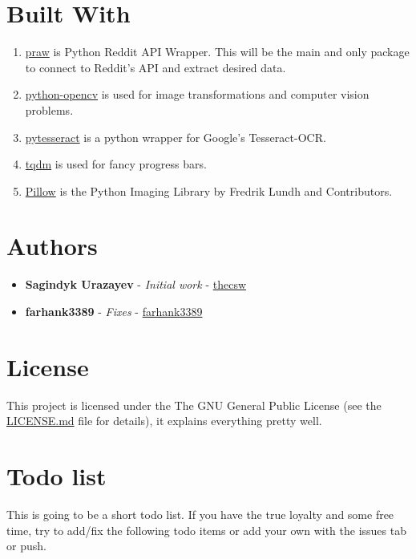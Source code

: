 \documentclass[11pt]{article}
\begin{document}
\section{Built With}
\label{sec-5}
\begin{enumerate}
\item \href{https://github.com/praw-dev/praw}{praw} is Python Reddit API Wrapper. This will be the main and only package to
connect to Reddit's API and extract desired data.
\item \href{https://pypi.python.org/pypi/opencv-python}{python-opencv} is used for image transformations and computer vision problems.
\item \href{https://pypi.python.org/pypi/pytesseract}{pytesseract} is a python wrapper for Google's Tesseract-OCR.
\item \href{https://pypi.python.org/pypi/tqdm}{tqdm} is used for fancy progress bars.
\item \href{https://pillow.readthedocs.io/en/latest/}{Pillow} is the Python  Imaging Library by Fredrik Lundh and Contributors.
\end{enumerate}

\section{Authors}
\label{sec-6}
\begin{itemize}
\item \textbf{Sagindyk Urazayev} - \emph{Initial work} - \href{https://github.com/thecsw}{thecsw}
\item \textbf{farhank3389} - \emph{Fixes} - \href{https://github.com/farhank3389}{farhank3389}
\end{itemize}
\section{License}
\label{sec-7}

This project is licensed under the The GNU General Public License (see the
\href{https://github.com/thecsw/prequelmemes_bot/blob/master/LICENSE}{LICENSE.md} file for details), it explains everything pretty well. 

\section{Todo list}
\label{sec-8}

This is going to be a short todo list. If you have the true loyalty and some
free time, try to add/fix the following todo items or add your own with the
issues tab or push.
\end{document}
